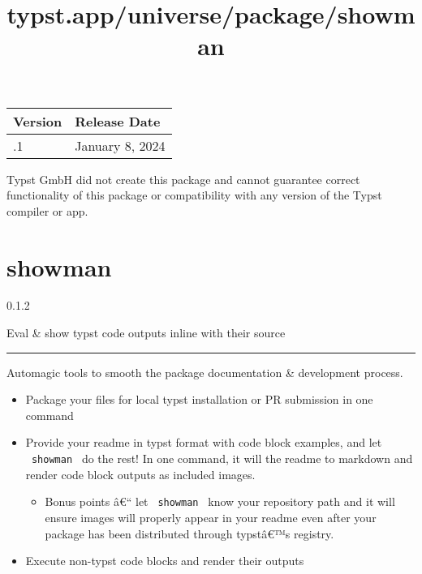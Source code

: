 \begin{longtable}[]{@{}ll@{}}
\toprule\noalign{}
Version & Release Date \\
\midrule\noalign{}
\endhead
\bottomrule\noalign{}
\endlastfoot
0.0.1 & January 8, 2024 \\
\end{longtable}

Typst GmbH did not create this package and cannot guarantee correct
functionality of this package or compatibility with any version of the
Typst compiler or app.


\title{typst.app/universe/package/showman}

\label{banner}
\section{showman}\label{showman}

{ 0.1.2 }

Eval \& show typst code outputs inline with their source

\label{readme}

\begin{center}\rule{0.5\linewidth}{0.5pt}\end{center}

Automagic tools to smooth the package documentation \& development
process.

\begin{itemize}
\item
  Package your files for local typst installation or PR submission in
  one command
\item
  Provide your readme in typst format with code block examples, and let
  \texttt{\ showman\ } do the rest! In one command, it will the readme
  to markdown and render code block outputs as included images.

  \begin{itemize}
  \tightlist
  \item
    Bonus points â€`` let \texttt{\ showman\ } know your repository path
    and it will ensure images will properly appear in your readme even
    after your package has been distributed through typstâ€™s registry.
  \end{itemize}
\item
  Execute non-typst code blocks and render their outputs
\end{itemize}

